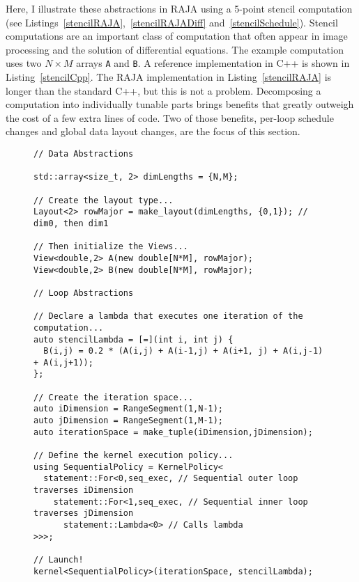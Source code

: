 Here, I illustrate these abstractions in RAJA using a 5-point stencil computation (see Listings~\ref{stencilRAJA},~\ref{stencilRAJADiff} and~\ref{stencilSchedule}).
Stencil computations are an important class of computation that often appear in image processing and the solution of differential equations.
The example computation uses two $N \times M$ arrays \verb.A. and \verb.B..
A reference implementation in C++ is shown in Listing~\ref{stencilCpp}.
The RAJA implementation in Listing~\ref{stencilRAJA} is longer than the standard C++, but this is not a problem.
Decomposing a computation into individually tunable parts brings benefits that greatly outweigh the cost of a few extra lines of code.
Two of those benefits, per-loop schedule changes and global data layout changes, are the focus of this section.

\begin{figure}
\begin{lstlisting}[caption={Data declaration using RAJA multi-dimensional data abstractions, called Views, followed by the description of a 5-point stencil kernel. Data is initialized to use row-major storage.}, label=stencilRAJA]
// Data Abstractions

std::array<size_t, 2> dimLengths = {N,M};

// Create the layout type...
Layout<2> rowMajor = make_layout(dimLengths, {0,1}); // dim0, then dim1

// Then initialize the Views...
View<double,2> A(new double[N*M], rowMajor); 
View<double,2> B(new double[N*M], rowMajor);

// Loop Abstractions

// Declare a lambda that executes one iteration of the computation...
auto stencilLambda = [=](int i, int j) {
  B(i,j) = 0.2 * (A(i,j) + A(i-1,j) + A(i+1, j) + A(i,j-1) + A(i,j+1));
};

// Create the iteration space...
auto iDimension = RangeSegment(1,N-1);
auto jDimension = RangeSegment(1,M-1);
auto iterationSpace = make_tuple(iDimension,jDimension);

// Define the kernel execution policy...
using SequentialPolicy = KernelPolicy<
  statement::For<0,seq_exec, // Sequential outer loop traverses iDimension
    statement::For<1,seq_exec, // Sequential inner loop traverses jDimension
      statement::Lambda<0> // Calls lambda
>>>;

// Launch!
kernel<SequentialPolicy>(iterationSpace, stencilLambda);
\end{lstlisting}
\end{figure}



